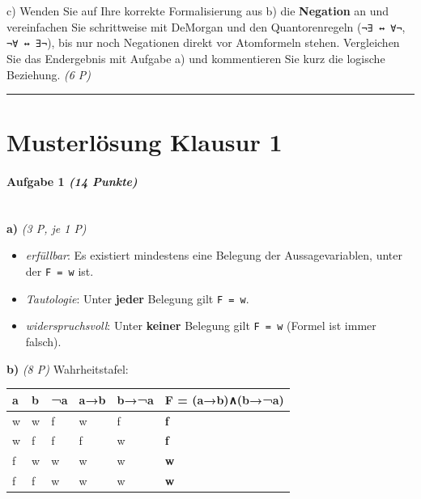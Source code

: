 \documentclass[11pt, a4paper]{article}
\begin{document}
c) Wenden Sie auf Ihre korrekte Formalisierung aus b) die \textbf{Negation} an und vereinfachen Sie schrittweise mit DeMorgan und den Quantorenregeln (\texttt{¬∃ ↔ ∀¬}, \texttt{¬∀ ↔ ∃¬}), bis nur noch Negationen direkt vor Atomformeln stehen. Vergleichen Sie das Endergebnis mit Aufgabe a) und kommentieren Sie kurz die logische Beziehung. \textit{(6 P)}



\noindent\textcolor{rulegray}{\rule{\linewidth}{0.4pt}}



\section{Musterlösung Klausur 1}

\paragraph{Aufgabe 1 \textit{(14 Punkte)}}\mbox{}\\[2pt]

\textbf{a)} \textit{(3 P, je 1 P)}

\begin{itemize}
  \item \textit{erfüllbar}: Es existiert mindestens eine Belegung der Aussagevariablen, unter der \texttt{F = w} ist.
  \item \textit{Tautologie}: Unter \textbf{jeder} Belegung gilt \texttt{F = w}.
  \item \textit{widerspruchsvoll}: Unter \textbf{keiner} Belegung gilt \texttt{F = w} (Formel ist immer falsch).
\end{itemize}

\textbf{b)} \textit{(8 P)} Wahrheitstafel:



{\small
\begin{tabularx}{\linewidth}{XXXXXX}
\hline
\rowcolor{tableheadbg}
{\color{white}\textbf{a}} & {\color{white}\textbf{b}} & {\color{white}\textbf{¬a}} & {\color{white}\textbf{a→b}} & {\color{white}\textbf{b→¬a}} & {\color{white}\textbf{F = (a→b)∧(b→¬a)}} \\[2pt]
\hline
\endhead
\hline
\endfoot
w & w & f & w & f & \textbf{f} \\
w & f & f & f & w & \textbf{f} \\
f & w & w & w & w & \textbf{w} \\
f & f & w & w & w & \textbf{w} \\
\end{tabularx}
}
\end{document}
